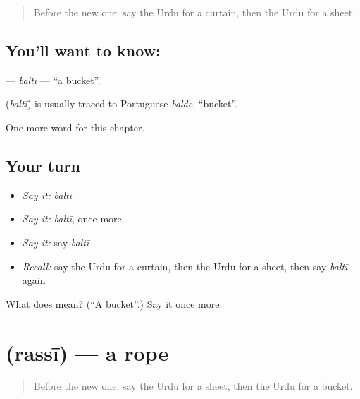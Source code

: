\label{lesson:UR-C107-balti}



\begin{quote}
Before the new one: say the Urdu for a curtain, then the Urdu for a sheet.
\end{quote}

\subsection*{You'll want to know: }
\textbf{} — \emph{baltī} — \textquotedblleft{}a bucket\textquotedblright{}.

\begin{cousinweb}
\textbf{} (\emph{baltī}) is usually traced to Portuguese \emph{balde}, \textquotedblleft{}bucket\textquotedblright{}.
\end{cousinweb}

\begin{grammarlens}[title={What you've built}]
One more word for this chapter.
\end{grammarlens}

\subsection*{Your turn}
\begin{itemize}
\raggedright
  \item \emph{Say it:} \emph{baltī}
  \item \emph{Say it:} \emph{baltī}, once more
  \item \emph{Say it:} say \emph{baltī}
  \item \emph{Recall:} say the Urdu for a curtain, then the Urdu for a sheet, then say \emph{baltī} again
\end{itemize}

\begin{tcolorbox}[breakable,colback=teal!4,colframe=teal!35!black,title={Before you move on}]
What does  mean? (\textquotedblleft{}A bucket\textquotedblright{}.) Say it once more.
\end{tcolorbox}
\section[\texorpdfstring{\ur{رسی} (rassī)}{رسی (rassī)}]{ (rassī) — a rope}

\label{lesson:UR-C107-rassi}



\begin{quote}
Before the new one: say the Urdu for a sheet, then the Urdu for a bucket.
\end{quote}

